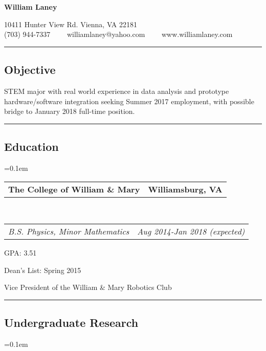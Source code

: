 \documentclass[10pt,letterpaper]{article}
\makeatletter
\newenvironment{indentsection}[1]%
{\begin{list}{}%
	{\setlength{\leftmargin}{#1}}%
	\item[]%
}
{\end{list}}
\newcommand{\headerrow}[2]
{\begin{tabular*}{\linewidth}{l@{\extracolsep{\fill}}r}
	#1 &
	#2 \\
\end{tabular*}}
\makeatother
\begin{document}
\begin{center}
{\LARGE \textbf{William Laney}}

10411 Hunter View Rd.
Vienna, VA 22181
\\
(703) 944-7337\ \ \textbullet
\ \ williamlaney@yahoo.com\ \ \textbullet
\ \ www.williamlaney.com
\end{center}

\hrule
\vspace{-0.4em}
\subsection*{Objective}

\begin{indentsection}{\parindent}
STEM major with real world experience in data analysis and
prototype hardware/software integration seeking Summer 2017 employment,
with possible bridge to January 2018 full-time position.
\end{indentsection}


\hrule
\vspace{-0.4em}
\subsection*{Education}

	\parskip=0.1em

	\headerrow
		{\textbf{The College of William \& Mary}}
		{\textbf{Williamsburg, VA}}
	\\
	\headerrow
		{\emph{B.S. Physics, Minor Mathematics}}
		{\emph{Aug 2014-Jan 2018 (expected)}}
	\begin{itemize*}
		\item GPA: 3.51
		\item Dean's List: Spring 2015
		\item Vice President of the William \& Mary Robotics Club
	\end{itemize*}



\hrule
\vspace{-0.4em}
\subsection*{Undergraduate Research}

	\parskip=0.1em
\end{document}
